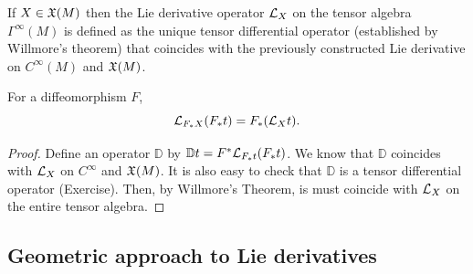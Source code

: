 \begin{defn}
If $X\in\mathfrak{X}(M)$ then the Lie derivative operator $\mathcal{L}_X$ on the tensor algebra $\Gamma^\infty(M)$ is defined as the unique tensor differential operator (established by Willmore's theorem) that coincides with the previously constructed Lie derivative on $C^\infty(M)$ and $\mathfrak{X}(M)$.
\end{defn}

\begin{prop}\label{pullbacks of Lie derivatives}
For a diffeomorphism $F$, 
\[\mathcal{L}_{F_\ast X}(F_\ast t)=F_\ast (\mathcal{L}_X t).\]
\end{prop}
\begin{proof}
Define an operator $\mathbb{D}$ by $\mathbb{D}t=F^\ast \mathcal{L}_{F_\ast t}(F_\ast t)$. We know that $\mathbb{D}$ coincides with $\mathcal{L}_X$ on $C^\infty$ and $\mathfrak{X}(M)$. It is also easy to check that $\mathbb{D}$ is a tensor differential operator (Exercise). Then, by Willmore's Theorem, is must coincide with $\mathcal{L}_X$ on the entire tensor algebra.
\end{proof}

\subsection{Geometric approach to Lie derivatives}

